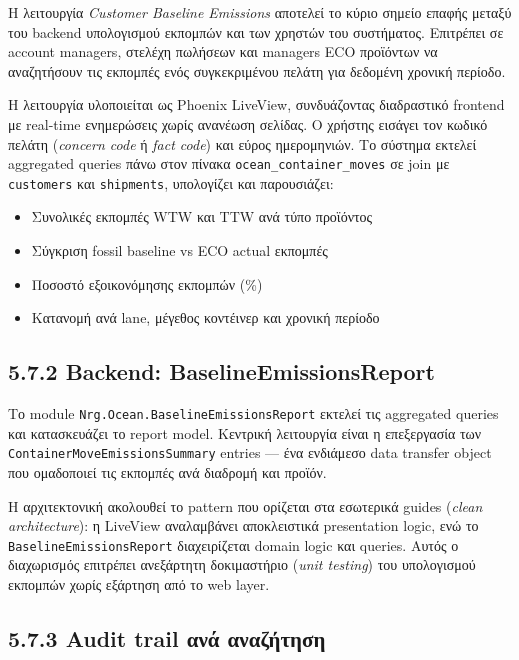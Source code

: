 Η λειτουργία \emph{Customer Baseline Emissions} αποτελεί το κύριο σημείο
επαφής μεταξύ του backend υπολογισμού εκπομπών και των χρηστών του
συστήματος. Επιτρέπει σε account managers, στελέχη πωλήσεων και managers
ECO προϊόντων να αναζητήσουν τις εκπομπές ενός συγκεκριμένου πελάτη για
δεδομένη χρονική περίοδο.

Η λειτουργία υλοποιείται ως Phoenix LiveView, συνδυάζοντας διαδραστικό
frontend με real-time ενημερώσεις χωρίς ανανέωση σελίδας. Ο χρήστης
εισάγει τον κωδικό πελάτη (\emph{concern code} ή \emph{fact code}) και
εύρος ημερομηνιών. Το σύστημα εκτελεί aggregated queries πάνω στον
πίνακα \texttt{ocean\_container\_moves} σε join με \texttt{customers}
και \texttt{shipments}, υπολογίζει και παρουσιάζει:

\begin{itemize}
\tightlist
\item
  Συνολικές εκπομπές WTW και TTW ανά τύπο προϊόντος
\item
  Σύγκριση fossil baseline vs ECO actual εκπομπές
\item
  Ποσοστό εξοικονόμησης εκπομπών (\%)
\item
  Κατανομή ανά lane, μέγεθος κοντέινερ και χρονική περίοδο
\end{itemize}

\subsection{5.7.2 Backend:
BaselineEmissionsReport}\label{backend-baselineemissionsreport}

Το module \texttt{Nrg.Ocean.BaselineEmissionsReport} εκτελεί τις
aggregated queries και κατασκευάζει το report model. Κεντρική λειτουργία
είναι η επεξεργασία των \texttt{ContainerMoveEmissionsSummary} entries
--- ένα ενδιάμεσο data transfer object που ομαδοποιεί τις εκπομπές ανά
διαδρομή και προϊόν.

Η αρχιτεκτονική ακολουθεί το pattern που ορίζεται στα εσωτερικά guides
(\emph{clean architecture}): η LiveView αναλαμβάνει αποκλειστικά
presentation logic, ενώ το \texttt{BaselineEmissionsReport}
διαχειρίζεται domain logic και queries. Αυτός ο διαχωρισμός επιτρέπει
ανεξάρτητη δοκιμαστήριο (\emph{unit testing}) του υπολογισμού εκπομπών
χωρίς εξάρτηση από το web layer.

\subsection{5.7.3 Audit trail ανά
αναζήτηση}\label{audit-trail-ux3b1ux3bdux3ac-ux3b1ux3bdux3b1ux3b6ux3aeux3c4ux3b7ux3c3ux3b7}

